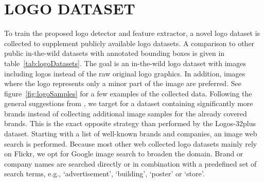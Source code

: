 \documentclass[a4paper,twoside]{article}
\newcommand{\xeg}{e.g.}
\begin{document}
\section{\uppercase{Logo Dataset}}
\noindent To train the proposed logo detector and feature extractor, a novel logo dataset is collected to supplement publicly available logo datasets. A comparison to other public in-the-wild datasets with annotated bounding boxes is given in table~\ref{tab:logoDatasets}.
The goal is an in-the-wild logo dataset with images including logos instead of the raw original logo graphics. In addition, images where the logo represents only a minor part of the image are preferred. See figure~\ref{fig:logoSamples} for a few examples of the collected data.
Following the general suggestions from \cite{bansal2017}, we target for a dataset containing significantly more brands instead of collecting additional image samples for the already covered brands. This is the exact opposite strategy than performed by the Logos-32plus dataset.
Starting with a list of well-known brands and companies, an image web search is performed. Because most other web collected logo datasets mainly rely on Flickr, we opt for Google image search to broaden the domain. Brand or company names are searched directly or in combination with a predefined set of search terms, \xeg, `advertisement', `building', `poster' or `store'. 
%
\end{document}

